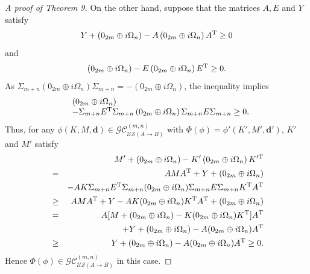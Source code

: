 \documentclass[10pt,aps,pra,amsfonts,amssymb,amsmath,%
floatfix,nofootinbib, groupedaddress,superscriptaddress,citesort,twocolumn
]{revtex4}%
\begin{document}
\begin{proof}[A proof of Theorem 9]
On the other hand, suppose that the matrices $A,E$ and $Y$ satisfy
\begin{eqnarray*}\label{N7}
	Y + \left( 0_{2m} \oplus i\Omega _n \right) - A\left(0_{2m} \oplus i\Omega _n \right){A^{\rm T}} \ge 0
\end{eqnarray*}	and
\begin{eqnarray*}\label{N72}
	\left( 0_{2m} \oplus i\Omega_n \right) -
	E \left( 0_{2m} \oplus i\Omega _n\right)E^{\rm T} \ge 0. 
\end{eqnarray*}	
As $\Sigma_{m+n} \left( 0_{2m} \oplus i\Omega _n\right)
\Sigma_{m+n}=-\left( 0_{2m} \oplus i\Omega _n\right)$, the inequality implies
$$\begin{array}{rl}
	&	\left( 0_{2m} \oplus i\Omega_n \right) \\
	&- \Sigma_{m+n}
	E^{\rm T}\Sigma_{m+n} \left( 0_{2m} \oplus i\Omega _n\right)
	\Sigma_{m+n} E \Sigma_{m+n}  \ge 0.
\end{array}	$$
Thus, for any $\phi(K,M,\mathbf d)\in {\mathcal {GC}}^{(m,n)}_{\mathcal {US}(A \rightarrow B)} $ with $\Phi(\phi)=\phi'(K',M',\mathbf d')$, 
$K'$ and $M'$ satisfy
\begin{eqnarray*}\label{N9}
	& &M' + ({0_{2m}} \oplus i{\Omega _n}) -K'\left( {0_{2m}} \oplus i{\Omega _n} \right){K'^{\rm T}} \\
	&=& {A}MA^{\rm T}+Y+(0_{2m} \oplus i\Omega _n)\\
	&&	-{A}{K}\Sigma_{m+n} E^{\rm T}\Sigma_{m+n} (0_{2m} \oplus i{\Omega _n})\Sigma_{m+n} E\Sigma_{m+n} {{K^{\rm T}}} {{ A}^{\rm T}}	\\
	&\ge& AMA^{\rm T}+Y- AK(0_{2m} \oplus i\Omega_n) K^{\rm T} A^{\rm T}+(0_{2m} \oplus i\Omega _n) \\
	&=& A[M+(0_{2m} \oplus i\Omega _n)-K(0_{2m} \oplus i\Omega_n) K^{\rm T}] A^{\rm T}\\
	&&	+ Y+(0_{2m} \oplus i\Omega _n)-A(0_{2m} \oplus i\Omega _n)A^{\rm T}\\
	&\ge& Y+(0_{2m} \oplus i\Omega _n)-A(0_{2m} \oplus i\Omega _n)A^{\rm T} \ge 0.
\end{eqnarray*}
Hence   $ \Phi \left( \phi  \right)\in {\mathcal {GC}}^{(m,n)}_{\mathcal {US}(A \rightarrow B)} $ in this case.
\end{proof}
\end{document}
